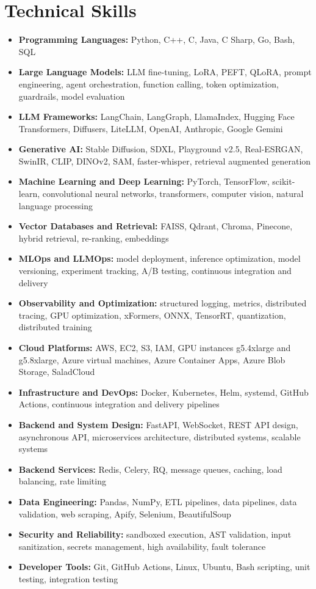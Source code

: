 \documentclass[10pt,letterpaper]{article}
\begin{document}
\section{Technical Skills}
\begin{itemize}[leftmargin=*,itemsep=2pt]
\item \textbf{Programming Languages:} Python, C++, C, Java, C Sharp, Go, Bash, SQL
\item \textbf{Large Language Models:} LLM fine-tuning, LoRA, PEFT, QLoRA, prompt engineering, agent orchestration, function calling, token optimization, guardrails, model evaluation
\item \textbf{LLM Frameworks:} LangChain, LangGraph, LlamaIndex, Hugging Face Transformers, Diffusers, LiteLLM, OpenAI, Anthropic, Google Gemini
\item \textbf{Generative AI:} Stable Diffusion, SDXL, Playground v2.5, Real-ESRGAN, SwinIR, CLIP, DINOv2, SAM, faster-whisper, retrieval augmented generation
\item \textbf{Machine Learning and Deep Learning:} PyTorch, TensorFlow, scikit-learn, convolutional neural networks, transformers, computer vision, natural language processing
\item \textbf{Vector Databases and Retrieval:} FAISS, Qdrant, Chroma, Pinecone, hybrid retrieval, re-ranking, embeddings
\item \textbf{MLOps and LLMOps:} model deployment, inference optimization, model versioning, experiment tracking, A/B testing, continuous integration and delivery
\item \textbf{Observability and Optimization:} structured logging, metrics, distributed tracing, GPU optimization, xFormers, ONNX, TensorRT, quantization, distributed training
\item \textbf{Cloud Platforms:} AWS, EC2, S3, IAM, GPU instances g5.4xlarge and g5.8xlarge, Azure virtual machines, Azure Container Apps, Azure Blob Storage, SaladCloud
\item \textbf{Infrastructure and DevOps:} Docker, Kubernetes, Helm, systemd, GitHub Actions, continuous integration and delivery pipelines
\item \textbf{Backend and System Design:} FastAPI, WebSocket, REST API design, asynchronous API, microservices architecture, distributed systems, scalable systems
\item \textbf{Backend Services:} Redis, Celery, RQ, message queues, caching, load balancing, rate limiting
\item \textbf{Data Engineering:} Pandas, NumPy, ETL pipelines, data pipelines, data validation, web scraping, Apify, Selenium, BeautifulSoup
\item \textbf{Security and Reliability:} sandboxed execution, AST validation, input sanitization, secrets management, high availability, fault tolerance
\item \textbf{Developer Tools:} Git, GitHub Actions, Linux, Ubuntu, Bash scripting, unit testing, integration testing
\end{itemize}
\end{document}
